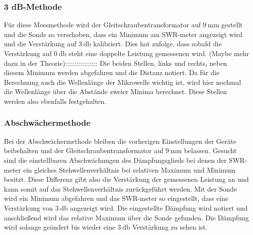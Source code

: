 \subsubsection{3 dB-Methode}
Für diese Messmethode wird der Gleitschraubentransformator auf $\SI{9}{\milli\meter}$ gestellt und die Sonde so verschoben, dass ein Minimum am SWR-meter angezeigt wird und die Verstärkung auf $\SI{3}{\decibel}$ kalibriert.  Dies hat zufolge, dass 
sobald die Verstärkung auf $\SI{0}{\decibel}$ steht eine doppelte Leistung gemessenen wird. (Maybe mehr dazu in der Theorie)::::::::::::::::: Die beiden Stellen, links und rechts, neben diesem Minimum werden abgefahren und die Distanz notiert. Da für die Berechnung auch die
Wellenlänge der Mikrowelle wichtig ist, wird hier nochmal die Wellenlänge über die Abstände zweier Minima berechnet. Diese Stellen werden also ebenfalls festgehalten.

\subsubsection{Abschwächermethode}
Bei der Abschwächermethode bleiben die vorherigen Einstellungen der Geräte beibehalten und der Gleitschraubentransformator auf $\SI{9}{\milli\meter}$ belassen. Gesucht sind die einstellbaren Abschwächungen des Dämpfungsglieds bei denen der SWR-meter 
ein gleiches Stehwellenverhältnis bei relativen Maximum und Minimum besitzt. Diese Differenz gibt also die Verstärkung der gemessenen Leistung an und kann somit auf das Stehwellenverhältnis zurückgeführt werden.
Mit der Sonde wird ein Minimum abgefahren und das SWR-meter so eingestellt, dass eine Verstärkung von $\SI{3}{\decibel}$ angezeigt wird. Die eingestellte Dämpfung wird notiert und anschließend wird das relative Maximum über die Sonde gefunden. Die Dämpfung wird solange
geändert bis wieder eine $\SI{3}{\decibel}$ Verstärkung zu sehen ist.

